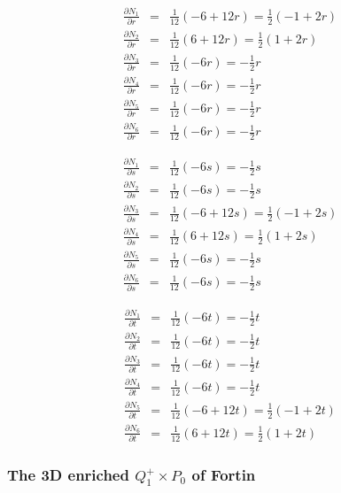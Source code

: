 \begin{eqnarray}
\frac{\partial N_1}{\partial r} &=& \frac{1}{12}(-6+12r) = \frac{1}{2}(-1+2r)\\
\frac{\partial N_2}{\partial r} &=& \frac{1}{12}(6+12r) = \frac{1}{2}(1+2r)\\
\frac{\partial N_3}{\partial r} &=& \frac{1}{12}(-6r) = -\frac{1}{2}r \\
\frac{\partial N_4}{\partial r} &=& \frac{1}{12}(-6r) = -\frac{1}{2}r \\
\frac{\partial N_5}{\partial r} &=& \frac{1}{12}(-6r) = -\frac{1}{2}r \\
\frac{\partial N_6}{\partial r} &=& \frac{1}{12}(-6r) = -\frac{1}{2}r 
\end{eqnarray}

\begin{eqnarray}
\frac{\partial N_1}{\partial s} &=& \frac{1}{12} (-6s) = -\frac{1}{2}s \\
\frac{\partial N_2}{\partial s} &=& \frac{1}{12} (-6s) = -\frac{1}{2}s \\
\frac{\partial N_3}{\partial s} &=& \frac{1}{12} (-6+12s) = \frac{1}{2} (-1+2s) \\ 
\frac{\partial N_4}{\partial s} &=& \frac{1}{12} (6+12s) = \frac{1}{2} (1+2s) \\ 
\frac{\partial N_5}{\partial s} &=& \frac{1}{12} (-6s) = -\frac{1}{2}s \\
\frac{\partial N_6}{\partial s} &=& \frac{1}{12} (-6s) = -\frac{1}{2}s 
\end{eqnarray}

\begin{eqnarray}
\frac{\partial N_1}{\partial t} &=& \frac{1}{12} (-6t) = -\frac{1}{2}t \\
\frac{\partial N_2}{\partial t} &=& \frac{1}{12} (-6t) = -\frac{1}{2}t \\
\frac{\partial N_3}{\partial t} &=& \frac{1}{12} (-6t) = -\frac{1}{2}t \\
\frac{\partial N_4}{\partial t} &=& \frac{1}{12} (-6t) = -\frac{1}{2}t \\
\frac{\partial N_5}{\partial t} &=& \frac{1}{12} (-6+12t) = \frac{1}{2} (-1+2t) \\ 
\frac{\partial N_6}{\partial t} &=& \frac{1}{12} (6+12t) = \frac{1}{2} (1+2t) 
\end{eqnarray}






\subsubsection{The 3D enriched $Q_1^+\times P_0$ of Fortin} \label{ss:Q1pP03D}

